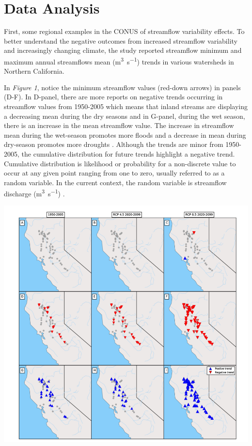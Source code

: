 \documentclass[a4paper,man,biblatex]{apa7}
\begin{document}
\section{Data Analysis}  
\par First, some regional examples in the CONUS of streamflow variability effects. To better understand the negative outcomes from increased streamflow variability and increasingly changing climate, the \textcite{mallakpour_2018} study reported streamflow minimum and maximum annual streamflows mean (\si{\cubic\meter\per\second}) trends in various watersheds in Northern California.\\ 
\par In \textit{Figure 1}, notice the minimum streamflow values (red-down arrows) in panels (D-F). In D-panel, there are more reports on negative trends occurring in streamflow values from 1950-2005 which means that inland streams are displaying a decreasing mean during the dry seasons and in G-panel, during the wet season, there is an increase in the mean streamflow value. The increase in streamflow mean during the wet-season promotes more floods and a decrease in mean during dry-season promotes more droughts \autocite{mallakpour_2018}. Although the trends are minor from 1950-2005, the cumulative distribution for future trends highlight a negative trend. Cumulative distribution is likelihood or probability for a non-discrete value to occur at any given point ranging from one to zero, usually referred to as a random variable. In the current context, the random variable is streamflow discharge (\si{\cubic\meter\per\second}) \autocite{cdf_def}.\\
 \begin{minipage}{0.65\linewidth}   
     \includegraphics[scale=0.35]{stream_flow_cali.png}
     \label{fig:streamflow_trend}
\end{minipage}
\end{document}
